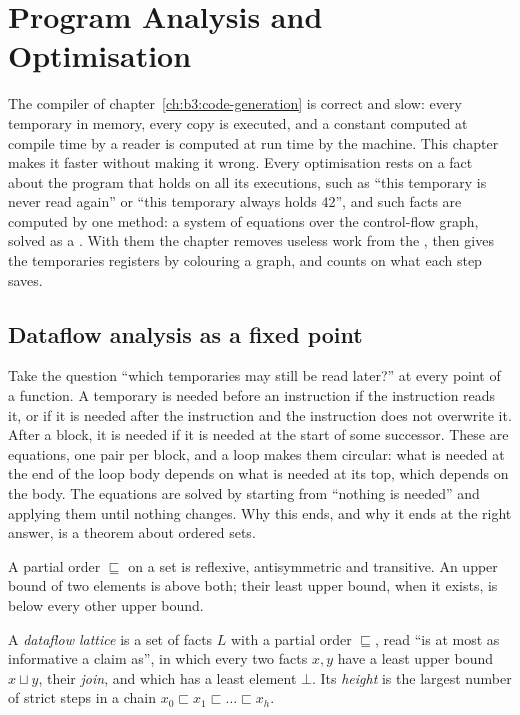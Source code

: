 \chapter{Program Analysis and Optimisation}\label{ch:b3:program-optimisation}

The compiler of chapter~\ref{ch:b3:code-generation} is correct and slow: every temporary  in memory, every copy is executed, and a constant computed at compile time by a reader is computed at run time by the machine. This chapter makes it faster without making it wrong. Every optimisation rests on a fact about the program that holds on all its executions, such as ``this temporary is never read again'' or ``this temporary always holds 42'', and such facts are computed by one method: a system of equations over the control-flow graph, solved as a . With them the chapter removes useless work from the , then gives the temporaries registers by colouring a graph, and counts on  what each step saves.

\section{Dataflow analysis as a fixed point}\label{sec:b3:program-optimisation:dataflow}

Take the question ``which temporaries may still be read later?'' at every point of a function. A temporary is needed before an instruction if the instruction reads it, or if it is needed after the instruction and the instruction does not overwrite it. After a block, it is needed if it is needed at the start of some successor. These are equations, one pair per block, and a loop makes them circular: what is needed at the end of the loop body depends on what is needed at its top, which depends on the body. The equations are solved by starting from ``nothing is needed'' and applying them until nothing changes. Why this ends, and why it ends at the right answer, is a theorem about ordered sets.

\begin{recall}
A partial order $\sqsubseteq$ on a set is reflexive, antisymmetric and transitive. An upper bound of two elements is above both; their least upper bound, when it exists, is below every other upper bound.
\end{recall}

\begin{definition}\label{def:b3:program-optimisation:lattice}
A \emph{dataflow lattice} is a set of facts $L$ with a partial order $\sqsubseteq$, read ``is at most as informative a claim as'', in which every two facts $x, y$ have a least upper bound $x \sqcup y$, their \emph{join}, and which has a least element $\bot$. Its \emph{height} is the largest number of strict steps in a chain $x_0 \sqsubset x_1 \sqsubset \dots \sqsubset x_h$.
\end{definition}

